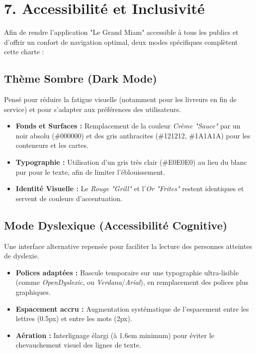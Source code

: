 \documentclass[12pt,a4paper]{article}
\begin{document}
\section{7. Accessibilité et Inclusivité}

Afin de rendre l'application "Le Grand Miam" accessible à tous les publics et d'offrir un confort de navigation optimal, deux modes spécifiques complètent cette charte :

\subsection{Thème Sombre (Dark Mode)}
Pensé pour réduire la fatigue visuelle (notamment pour les livreurs en fin de service) et pour s'adapter aux préférences des utilisateurs.
\begin{itemize}[label=\textcolor{CoalBlack}{\tiny\faCircle}, itemsep=0pt]
    \item \textbf{Fonds et Surfaces :} Remplacement de la couleur \textit{Crème "Sauce"} par un noir absolu (\#000000) et des gris anthracites (\#121212, \#1A1A1A) pour les conteneurs et les cartes.
    \item \textbf{Typographie :} Utilisation d'un gris très clair (\#E0E0E0) au lieu du blanc pur pour le texte, afin de limiter l'éblouissement.
    \item \textbf{Identité Visuelle :} Le \textit{Rouge "Grill"} et l'\textit{Or "Frites"} restent identiques et servent de couleurs d'accentuation.
\end{itemize}

\subsection{Mode Dyslexique (Accessibilité Cognitive)}
Une interface alternative repensée pour faciliter la lecture des personnes atteintes de dyslexie.
\begin{tcolorbox}[colback=white, colframe=CoalBlack, arc=2mm, boxrule=1pt, drop fuzzy shadow]
    \begin{itemize}[label=\textcolor{GrillRed}{\faCheck}, leftmargin=*]
        \item \textbf{Polices adaptées :} Bascule temporaire sur une typographie ultra-lisible (comme \textit{OpenDyslexic}, ou \textit{Verdana}/\textit{Arial}), en remplacement des polices plus graphiques.
        \item \textbf{Espacement accru :} Augmentation systématique de l'espacement entre les lettres (0.5px) et entre les mots (2px).
        \item \textbf{Aération :} Interlignage élargi (à 1.6em minimum) pour éviter le chevauchement visuel des lignes de texte.
    \end{itemize}
\end{tcolorbox}
\end{document}
